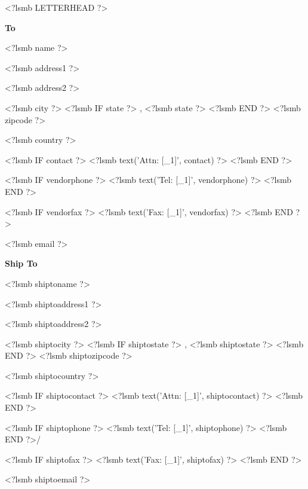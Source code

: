 \documentclass{scrartcl}
\begin{document}
\pagestyle{myheadings}
\thispagestyle{empty}

\fontsize{10pt}{12pt}\selectfont

<?lsmb LETTERHEAD ?>



\vspace*{0.5cm}

\parbox[t]{.5\textwidth}{
\textbf{To}
\vspace{0.3cm}
  
<?lsmb name ?>

<?lsmb address1 ?>

<?lsmb address2 ?>

<?lsmb city ?>
<?lsmb IF state ?>
\hspace{-0.1cm}, <?lsmb state ?>
<?lsmb END ?>
<?lsmb zipcode ?>

<?lsmb country ?>

\vspace{0.3cm}

<?lsmb IF contact ?>
<?lsmb text('Attn: [_1]', contact) ?>
\vspace{0.2cm}
<?lsmb END ?>

<?lsmb IF vendorphone ?>
<?lsmb text('Tel: [_1]', vendorphone) ?>
<?lsmb END ?>

<?lsmb IF vendorfax ?>
<?lsmb text('Fax: [_1]', vendorfax) ?>
<?lsmb END ?>

<?lsmb email ?>
}
\parbox[t]{.5\textwidth}{
\textbf{Ship To}
\vspace{0.3cm}

<?lsmb shiptoname ?>

<?lsmb shiptoaddress1 ?>

<?lsmb shiptoaddress2 ?>

<?lsmb shiptocity ?>
<?lsmb IF shiptostate ?>
\hspace{-0.1cm}, <?lsmb shiptostate ?>
<?lsmb END ?>
<?lsmb shiptozipcode ?>

<?lsmb shiptocountry ?>

\vspace{0.3cm}

<?lsmb IF shiptocontact ?>
<?lsmb text('Attn: [_1]', shiptocontact) ?>
\vspace{0.2cm}
<?lsmb END ?>

<?lsmb IF shiptophone ?>
<?lsmb text('Tel: [_1]', shiptophone) ?>
<?lsmb END ?>/

<?lsmb IF shiptofax ?>
<?lsmb text('Fax: [_1]', shiptofax) ?>
<?lsmb END ?>

<?lsmb shiptoemail ?>
}
\hfill
\end{document}
